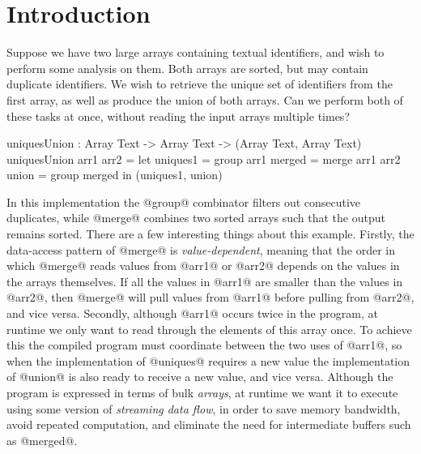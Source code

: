 \section{Introduction}
\label{s:Introduction}


Suppose we have two large arrays containing textual identifiers, and wish to perform some analysis on them. Both arrays are sorted, but may contain duplicate identifiers. 
We wish to retrieve the unique set of identifiers from the first array, as well as produce the union of both arrays. Can we perform both of these tasks at once, without reading the input arrays multiple times?
\begin{code}
  uniquesUnion : Array Text -> Array Text -> (Array Text, Array Text)
  uniquesUnion arr1 arr2
   = let  uniques1 = group arr1
          merged   = merge arr1 arr2
          union    = group merged
     in   (uniques1, union)
\end{code}



In this implementation the @group@ combinator filters out consecutive duplicates, while @merge@ combines two sorted arrays such that the output remains sorted. There are a few interesting things about this example. 
Firstly, the data-access pattern of @merge@ is \emph{value-dependent}, meaning that the order in which @merge@ reads values from @arr1@ or @arr2@ depends on the values in the arrays themselves. If all the values in @arr1@ are smaller than the values in @arr2@, then @merge@ will pull values from @arr1@ before pulling from @arr2@, and vice versa.
Secondly, although @arr1@ occurs twice in the program, at runtime we only want to read through the elements of this array once. To achieve this the compiled program must coordinate between the two uses of @arr1@, so when the implementation of @uniques@ requires a new value the implementation of @union@ is also ready to receive a new value, and vice versa.
Although the program is expressed in terms of bulk \emph{arrays}, at runtime we want it to execute using some version of \emph{streaming data flow}, in order to save memory bandwidth, avoid repeated computation, and eliminate the need for intermediate buffers such as @merged@.

